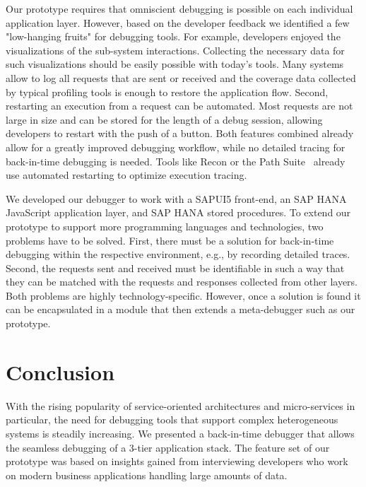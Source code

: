 Our prototype requires that omniscient debugging is possible on each individual application layer.
However, based on the developer feedback we identified a few "low-hanging fruits" for debugging tools.
For example, developers enjoyed the visualizations of the sub-system interactions.
Collecting the necessary data for such visualizations should be easily possible with today's tools.
Many systems allow to log all requests that are sent or received and the coverage data collected by typical profiling tools is enough to restore the application flow.
Second, restarting an execution from a request can be automated.
Most requests are not large in size and can be stored for the length of a debug session, allowing developers to restart with the push of a button.
Both features combined already allow for a greatly improved debugging workflow, while no detailed tracing for back-in-time debugging is needed.
Tools like Recon or the Path Suite~\cite{lee11:unified_debugging_of_distributed, perscheid13:test-driven_fault_navigation} already use automated restarting to optimize execution tracing.

We developed our debugger to work with a SAPUI5 front-end, an SAP HANA JavaScript application layer, and SAP HANA stored procedures.
To extend our prototype to support more programming languages and technologies, two problems have to be solved.
First, there must be a solution for back-in-time debugging within the respective environment, e.g., by recording detailed traces.
Second, the requests sent and received must be identifiable in such a way that they can be matched with the requests and responses collected from other layers.
Both problems are highly technology-specific. 
However, once a solution is found it can be encapsulated in a module that then extends a meta-debugger such as our prototype.

\section{Conclusion}

With the rising popularity of service-oriented architectures and micro-services in particular, the need for debugging tools that support complex heterogeneous systems is steadily increasing.
We presented a back-in-time debugger that allows the seamless debugging of a 3-tier application stack.
The feature set of our prototype was based on insights gained from interviewing developers who work on modern business applications handling large amounts of data.

